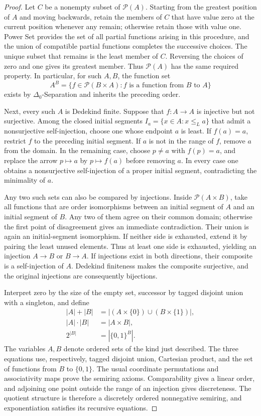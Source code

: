 \documentclass[11pt,a4paper]{article}
\theoremstyle{plain}
\theoremstyle{definition}
\theoremstyle{remark}
\begin{document}
\begin{proof}
  Let \(C\) be a nonempty subset of \(\mathcal P(A)\). Starting from the greatest position of \(A\) and moving backwards, retain the members of \(C\) that have value zero at the current position whenever any remain; otherwise retain those with value one. Power Set provides the set of all partial functions arising in this procedure, and the union of compatible partial functions completes the successive choices. The unique subset that remains is the least member of \(C\). Reversing the choices of zero and one gives its greatest member. Thus \(\mathcal P(A)\) has the same required property. In particular, for such \(A,B\), the function set
  \[
  A^B=\{f\in\mathcal P(B\times A):f\text{ is a function from }B\text{ to }A\}
  \]
  exists by \(\Delta_0\)-Separation and inherits the preceding order.

  Next, every such \(A\) is Dedekind finite. Suppose that \(f:A\to A\) is injective but not surjective. Among the closed initial segments
  \(I_a=\{x\in A:x\leq_La\}\) that admit a nonsurjective self-injection, choose one whose endpoint \(a\) is least. If \(f(a)=a\), restrict \(f\) to the preceding initial segment. If \(a\) is not in the range of \(f\), remove \(a\) from the domain. In the remaining case, choose \(p\neq a\) with \(f(p)=a\), and replace the arrow \(p\mapsto a\) by \(p\mapsto f(a)\) before removing \(a\). In every case one obtains a nonsurjective self-injection of a proper initial segment, contradicting the minimality of \(a\).

  Any two such sets can also be compared by injections. Inside \(\mathcal P(A\times B)\), take all functions that are order isomorphisms between an initial segment of \(A\) and an initial segment of \(B\). Any two of them agree on their common domain; otherwise the first point of disagreement gives an immediate contradiction. Their union is again an initial-segment isomorphism. If neither side is exhausted, extend it by pairing the least unused elements. Thus at least one side is exhausted, yielding an injection \(A\to B\) or \(B\to A\). If injections exist in both directions, their composite is a self-injection of \(A\). Dedekind finiteness makes the composite surjective, and the original injections are consequently bijections.

  Interpret zero by the size of the empty set, successor by tagged disjoint union with a singleton, and define
  \[
  \begin{aligned}
  |A|+|B|&=|(A\times\{0\})\cup(B\times\{1\})|,\\
  |A|\cdot|B|&=|A\times B|,\\
  2^{|B|}&=|\{0,1\}^{B}|.
  \end{aligned}
  \]
  The variables \(A,B\) denote ordered sets of the kind just described. The three equations use, respectively, tagged disjoint union, Cartesian product, and the set of functions from \(B\) to \(\{0,1\}\). The usual coordinate permutations and associativity maps prove the semiring axioms. Comparability gives a linear order, and adjoining one point outside the range of an injection gives discreteness. The quotient structure is therefore a discretely ordered nonnegative semiring, and exponentiation satisfies its recursive equations.


\end{proof}
\end{document}
